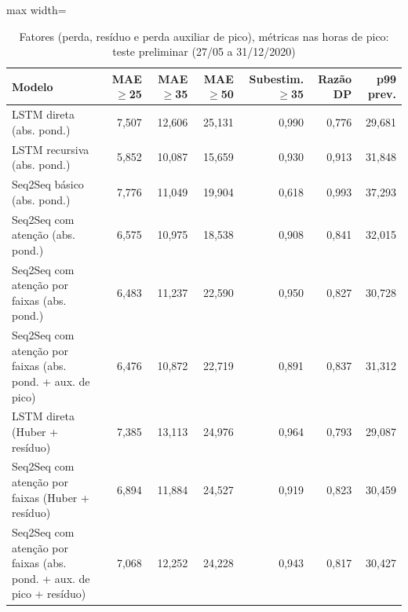 \begin{table}[!htbp]
    \centering
    \caption{Fatores (perda, resíduo e perda auxiliar de pico), métricas nas horas de pico: teste preliminar (27/05 a 31/12/2020)}
    \label{tab:cauda_fatores_teste_historico}
    \small
    \begin{adjustbox}{max width=\textwidth}
    \begin{tabular}{>{\raggedright\arraybackslash}p{}rrrrrr}
        \toprule
        Modelo & MAE $\geq$25 & MAE $\geq$35 & MAE $\geq$50 & Subestim. $\geq$35 & Razão DP & p99 prev. \\
        \midrule
        LSTM direta (abs. pond.) & 7,507 & 12,606 & 25,131 & 0,990 & 0,776 & 29,681 \\
        LSTM recursiva (abs. pond.) & 5,852 & 10,087 & 15,659 & 0,930 & 0,913 & 31,848 \\
        Seq2Seq básico (abs. pond.) & 7,776 & 11,049 & 19,904 & 0,618 & 0,993 & 37,293 \\
        Seq2Seq com atenção (abs. pond.) & 6,575 & 10,975 & 18,538 & 0,908 & 0,841 & 32,015 \\
        Seq2Seq com atenção por faixas (abs. pond.) & 6,483 & 11,237 & 22,590 & 0,950 & 0,827 & 30,728 \\
        Seq2Seq com atenção por faixas (abs. pond. + aux. de pico) & 6,476 & 10,872 & 22,719 & 0,891 & 0,837 & 31,312 \\
        LSTM direta (Huber + resíduo) & 7,385 & 13,113 & 24,976 & 0,964 & 0,793 & 29,087 \\
        Seq2Seq com atenção por faixas (Huber + resíduo) & 6,894 & 11,884 & 24,527 & 0,919 & 0,823 & 30,459 \\
        Seq2Seq com atenção por faixas (abs. pond. + aux. de pico + resíduo) & 7,068 & 12,252 & 24,228 & 0,943 & 0,817 & 30,427 \\
        \bottomrule
    \end{tabular}
    \end{adjustbox}
\end{table}
